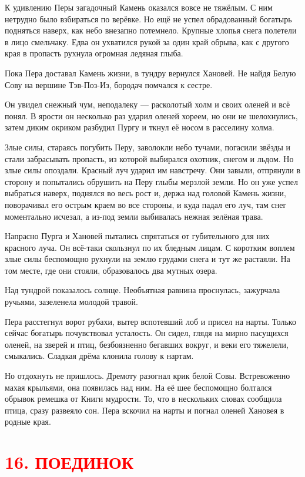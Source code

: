 \documentclass[oneside,final,14pt]{extreport}
\begin{document}
	К удивлению Перы загадочный Камень оказался вовсе не тяжёлым. С ним нетрудно было взбираться по верёвке. Но ещё не успел обрадованный богатырь подняться наверх, как небо внезапно потемнело. Крупные хлопья снега полетели в лицо смельчаку. Едва он ухватился рукой за один край обрыва, как с другого края в пропасть рухнула огромная ледяная глыба.
	
	Пока Пера доставал Камень жизни, в тундру вернулся Хановей. Не найдя Белую Сову на вершине Тэв-Поз-Из, бородач помчался к сестре.
	
	Он увидел снежный чум, неподалеку — расколотый холм и своих оленей и всё понял. В ярости он несколько раз ударил оленей хореем, но они не шелохнулись, затем диким окриком разбудил Пургу и ткнул её носом в расселину холма.
	
	Злые силы, стараясь погубить Перу, заволокли небо тучами, погасили звёзды и стали забрасывать пропасть, из которой выбирался охотник, снегом и льдом. Но злые силы опоздали. Красный луч ударил им навстречу. Они завыли, отпрянули в сторону и попытались обрушить на Перу глыбы мерзлой земли. Но он уже успел выбраться наверх, поднялся во весь рост и, держа над головой Камень жизни, поворачивал его острым краем во все стороны, и куда падал его луч, там снег моментально исчезал, а из-под земли выбивалась нежная зелёная трава.
	
	Напрасно Пурга и Хановей пытались спрятаться от губительного для них красного луча. Он всё-таки скользнул по их бледным лицам. С коротким воплем злые силы беспомощно рухнули на землю грудами снега и тут же растаяли. На том месте, где они стояли, образовалось два мутных озера.
	
	Над тундрой показалось солнце. Необъятная равнина проснулась, зажурчала ручьями, зазеленела молодой травой.
	
	Пера расстегнул ворот рубахи, вытер вспотевший лоб и присел на нарты. Только сейчас богатырь почувствовал усталость. Он сидел, глядя на мирно пасущихся оленей, на зверей и птиц, безбоязненно бегавших вокруг, и веки его тяжелели, смыкались. Сладкая дрёма клонила голову к нартам.
	
	Но отдохнуть не пришлось. Дремоту разогнал крик белой Совы. Встревоженно махая крыльями, она появилась над ним. На её шее беспомощно болтался обрывок ремешка от Книги мудрости. То, что в нескольких словах сообщила птица, сразу развеяло сон. Пера вскочил на нарты и погнал оленей Хановея в родные края.
	
	
				\section[16. Поединок]{\center \textcolor{red}{16. ПОЕДИНОК}}
\end{document}
